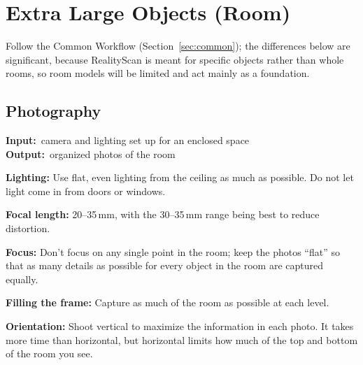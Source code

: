 \documentclass[11pt]{article}
\newcommand{\inout}[2]{%
    \begin{stageio}%
    \textbf{Input:}~#1\\[2pt]%
    \textbf{Output:}~#2%
    \end{stageio}%
}
\begin{document}
\section{Extra Large Objects (Room)}
Follow the Common Workflow (Section~\ref{sec:common}); the differences below are significant, because RealityScan is meant for specific objects rather than whole rooms, so room models will be limited and act mainly as a foundation.

\subsection{Photography}
\inout{camera and lighting set up for an enclosed space}{organized photos of the room}

\textbf{Lighting:} Use flat, even lighting from the ceiling as much as possible. Do not let light come in from doors or windows.

\textbf{Focal length:} 20--35\,mm, with the 30--35\,mm range being best to reduce distortion.

\textbf{Focus:} Don't focus on any single point in the room; keep the photos ``flat'' so that as many details as possible for every object in the room are captured equally.

\textbf{Filling the frame:} Capture as much of the room as possible at each level.

\textbf{Orientation:} Shoot vertical to maximize the information in each photo. It takes more time than horizontal, but horizontal limits how much of the top and bottom of the room you see.
\end{document}
